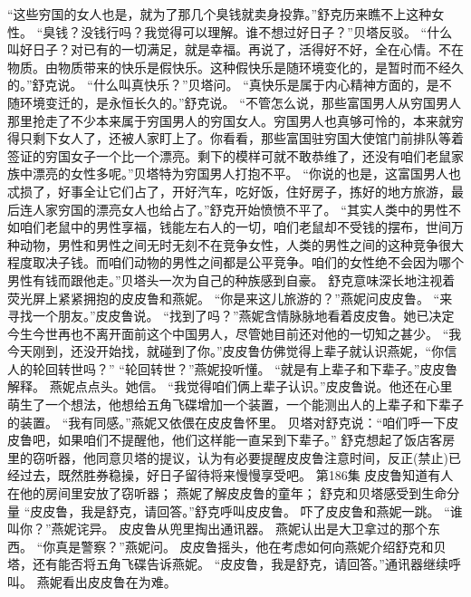 \documentclass[a4paper,12pt,UTF8,twoside]{ctexbook}
\begin{document}
        “这些穷国的女人也是，就为了那几个臭钱就卖身投靠。”舒克历来瞧不上这种女性。 
        “臭钱？没钱行吗？我觉得可以理解。谁不想过好日子？”贝塔反驳。 
        “什么叫好日子？对已有的一切满足，就是幸福。再说了，活得好不好，全在心情。不在物质。由物质带来的快乐是假快乐。这种假快乐是随环境变化的，是暂时而不经久的。”舒克说。 
        “什么叫真快乐？”贝塔问。 
        “真快乐是属于内心精神方面的，是不随环境变迁的，是永恒长久的。”舒克说。 
        “不管怎么说，那些富国男人从穷国男人那里抢走了不少本来属于穷国男人的穷国女人。穷国男人也真够可怜的，本来就穷得只剩下女人了，还被人家盯上了。你看看，那些富国驻穷国大使馆门前排队等着签证的穷国女子一个比一个漂亮。剩下的模样可就不敢恭维了，还没有咱们老鼠家族中漂亮的女性多呢。”贝塔特为穷国男人打抱不平。 
        “你说的也是，这富国男人也忒损了，好事全让它们占了，开好汽车，吃好饭，住好房子，拣好的地方旅游，最后连人家穷国的漂亮女人也给占了。”舒克开始愤愤不平了。 
        “其实人类中的男性不如咱们老鼠中的男性享福，钱能左右人的一切，咱们老鼠却不受钱的摆布，世间万种动物，男性和男性之间无时无刻不在竞争女性，人类的男性之间的这种竞争很大程度取决子钱。而咱们动物的男性之间都是公平竞争。咱们的女性绝不会因为哪个男性有钱而跟他走。”贝塔头一次为自己的种族感到自豪。 
        舒克意味深长地注视着荧光屏上紧紧拥抱的皮皮鲁和燕妮。 
        “你是来这儿旅游的？”燕妮问皮皮鲁。 
        “来寻找一个朋友。”皮皮鲁说。 
        “找到了吗？”燕妮含情脉脉地看着皮皮鲁。她已决定今生今世再也不离开面前这个中国男人，尽管她目前还对他的一切知之甚少。 
        “我今天刚到，还没开始找，就碰到了你。”皮皮鲁仿佛觉得上辈子就认识燕妮，“你信人的轮回转世吗？” 
        “轮回转世？”燕妮投听懂。 
        “就是有上辈子和下辈子。”皮皮鲁解释。 
        燕妮点点头。她信。 
        “我觉得咱们俩上辈子认识。”皮皮鲁说。他还在心里萌生了一个想法，他想给五角飞碟增加一个装置，一个能测出人的上辈子和下辈子的装置。 
        “我有同感。”燕妮又依偎在皮皮鲁怀里。 
        贝塔对舒克说：“咱们呼一下皮皮鲁吧，如果咱们不提醒他，他们这样能一直呆到下辈子。” 
        舒克想起了饭店客房里的窃听器，他同意贝塔的提议，认为有必要提醒皮皮鲁注意时间，反正(禁止)已经过去，既然胜券稳操，好日子留待将来慢慢享受吧。   第186集 
        皮皮鲁知道有人在他的房间里安放了窃听器； 
        燕妮了解皮皮鲁的童年； 
        舒克和贝塔感受到生命分量   
        “皮皮鲁，我是舒克，请回答。”舒克呼叫皮皮鲁。 
        吓了皮皮鲁和燕妮一跳。 
        “谁叫你？”燕妮诧异。 
        皮皮鲁从兜里掏出通讯器。 
        燕妮认出是大卫拿过的那个东西。 
        “你真是警察？”燕妮问。 
        皮皮鲁摇头，他在考虑如何向燕妮介绍舒克和贝塔，还有能否将五角飞碟告诉燕妮。 
        “皮皮鲁，我是舒克，请回答。”通讯器继续呼叫。 
        燕妮看出皮皮鲁在为难。 
\end{document}
